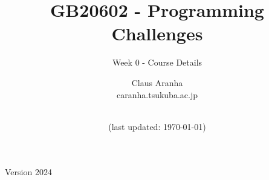 \documentclass[aspectratio=169]{beamer}
\title[Programming Challenges]{GB20602 - Programming Challenges}
\subtitle[Week 0]{Week 0 - Course Details}
\author[Claus Aranha]{Claus Aranha\\{\footnotesize caranha\@@cs.tsukuba.ac.jp}}
\institute[]{College of Information Sciences}
\date[]{\\{\smaller(last updated: \today)}}
\begin{document}
\begin{CJK}{UTF8}{ipxm}

\begin{frame}
\maketitle
\vfill

\hfill Version 2024
\end{frame}





\end{CJK}
\end{document}
